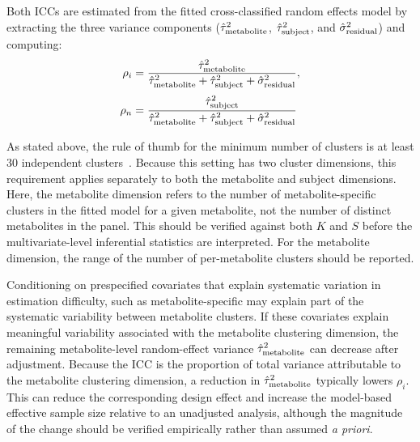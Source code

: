 Both ICCs are estimated from the fitted cross-classified random effects model by extracting the three variance components ($\hat{\tau}^2_{\textnormal{metabolite}}$, $\hat{\tau}^2_{\textnormal{subject}}$, and $\hat{\sigma}^2_{\textnormal{residual}}$) and computing:
\begin{subequations}\label{eqn:icc_cc}
    \begin{align}
        \rho_i &= \frac{\hat{\tau}^2_{\textnormal{metabolite}}}
                      {\hat{\tau}^2_{\textnormal{metabolite}} +
                       \hat{\tau}^2_{\textnormal{subject}} +
                       \hat{\sigma}^2_{\textnormal{residual}}},\label{eqn:icc_cc met}\\[2pt]
        \rho_n &= \frac{\hat{\tau}^2_{\textnormal{subject}}}
                      {\hat{\tau}^2_{\textnormal{metabolite}} +
                       \hat{\tau}^2_{\textnormal{subject}} +
                       \hat{\sigma}^2_{\textnormal{residual}}}\label{eqn:icc_cc subject}
    \end{align}
\end{subequations}

As stated above, the rule of thumb for the minimum number of clusters is at least 30 independent clusters~\cite{Cameron2008}. Because this setting has two cluster dimensions, this requirement applies separately to both the metabolite and subject dimensions. Here, the metabolite dimension refers to the number of metabolite-specific clusters in the fitted model for a given metabolite, not the number of distinct metabolites in the panel. This should be verified against both $K$ and $S$ before the multivariate-level inferential statistics are interpreted. For the metabolite dimension, the range of the number of per-metabolite clusters should be reported.

Conditioning on prespecified covariates that explain systematic variation in estimation difficulty, such as metabolite-specific \mSNR may explain part of the systematic variability between metabolite clusters. If these covariates explain meaningful variability associated with the metabolite clustering dimension, the remaining metabolite-level random-effect variance $\hat{\tau}_{\textnormal{metabolite}}^2$ can decrease after adjustment. Because the ICC is the proportion of total variance attributable to the metabolite clustering dimension, a reduction in $\hat{\tau}_{\textnormal{metabolite}}^2$ typically lowers $\rho_i$. This can reduce the corresponding design effect and increase the model-based effective sample size relative to an unadjusted analysis, although the magnitude of the change should be verified empirically rather than assumed \textit{a priori}.

